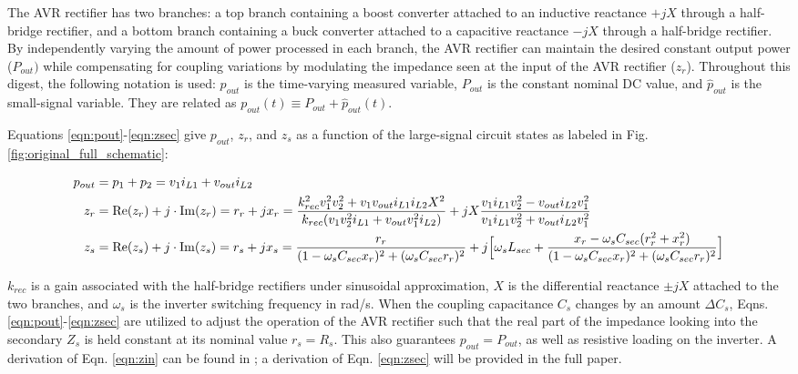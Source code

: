 \documentclass[journal, onecolumn, final, letterpaper, 11pt]{IEEEtran}
\begin{document}
The AVR rectifier has two branches: a top branch containing a boost converter attached to an inductive reactance $+jX$ through a half-bridge rectifier, and a bottom branch containing a buck converter attached to a capacitive reactance $-jX$ through a half-bridge rectifier. By independently varying the amount of power processed in each branch, the AVR rectifier can maintain the desired constant output power ($P_{out})$ while compensating for coupling variations by modulating the impedance seen at the input of the AVR rectifier ($z_r$). Throughout this digest, the following notation is used: $p_{out}$ is the time-varying measured variable, $P_{out}$ is the constant nominal DC value, and $\hat{p}_{out}$ is the small-signal variable. They are related as $p_{out}(t) \equiv P_{out} + \hat{p}_{out}(t)$. 

Equations \ref{eqn:pout}-\ref{eqn:zsec} give $p_{out}$, $z_r$, and $z_s$ as a function of the large-signal circuit states as labeled in Fig. \ref{fig:original_full_schematic}:

\footnotesize
\vspace{-0.8cm}
\begin{subequations}\label{eqn:pout_zin}
	\begin{align}
		p_{out} &= p_1 + p_2 = v_1 i_{L1} + v_{out} i_{L2} \label{eqn:pout} \\
		z_r &= \operatorname{Re}(z_r) + j\cdot\operatorname{Im}(z_r) = r_r + jx_r = \frac{k_{rec}^2 v_1^2 v_2^2 + v_1v_{out}i_{L1}i_{L2}X^2}{k_{rec}(v_1v_2^2i_{L1} + v_{out}v_1^2i_{L2})} + jX\frac{v_1 i_{L1}v_2^2 - v_{out} i_{L2}v_1^2}{v_1 i_{L1}v_2^2 + v_{out} i_{L2}v_1^2} \label{eqn:zin} \\
		z_s &=  \operatorname{Re}(z_s) + j\cdot\operatorname{Im}(z_s) = r_s + jx_s = \frac{r_r}{(1-\omega_s C_{sec} x_r)^2 + (\omega_s C_{sec}r_r)^2} + j\Bigl[\omega_s L_{sec} + \frac{x_r - \omega_s C_{sec} (r_r^2 + x_r^2)}{(1-\omega_s C_{sec} x_r)^2 + (\omega_s C_{sec}r_r)^2}\Bigr] \label{eqn:zsec}
	\end{align}
\end{subequations}
\normalsize

\vspace{-0.2cm}

$k_{rec}$ is a gain associated with the half-bridge rectifiers under sinusoidal approximation, $X$ is the differential reactance $\pm jX$ attached to the two branches, and $\omega_s$ is the inverter switching frequency in rad/s. When the coupling capacitance $C_s$ changes by an amount $\Delta C_s$, Eqns. \ref{eqn:pout}-\ref{eqn:zsec} are utilized to adjust the operation of the AVR rectifier such that the real part of the impedance looking into the secondary $Z_s$ is held constant at its nominal value $r_s = R_s$. This also guarantees $p_{out} = P_{out}$, as well as resistive loading on the inverter. A derivation of Eqn. \ref{eqn:zin} can be found in \cite{2019_Sinha_Journal}; a derivation of Eqn. \ref{eqn:zsec} will be provided in the full paper.
\end{document}
